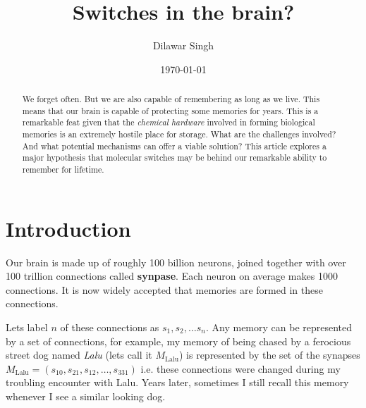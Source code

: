 \documentclass[]{resonance}
\title{Switches in the brain?}
\author{Dilawar Singh}
\date{\today}
\begin{document}
\maketitle

\begin{abstract}
    We forget often. But we are also capable of remembering as long
    as we live. This means that our brain is capable of protecting some memories for
    years. This is a remarkable feat given that the \emph{chemical hardware}
    involved in forming biological memories is an extremely hostile place for
    storage.  What are the challenges involved? And what potential mechanisms
    can offer a viable solution? This article explores a major hypothesis that
    molecular switches may be behind our remarkable ability to remember for lifetime.
\end{abstract}

\maketitle


\section{Introduction}\label{sec:intro}

Our brain is made up of roughly 100 billion neurons, joined together with over
100 trillion connections called \textbf{synpase}. Each neuron on average makes
1000 connections.   It is now widely accepted that memories are
formed in these connections.

Lets label $n$ of these connections as $s_1, s_2, \ldots s_n$. Any memory can be
represented by a set of connections, for example, my memory of being chased by a
ferocious street dog named \emph{Lalu} (lets call it $M_\text{Lalu}$) is
represented by the set of the synapses $M_\text{Lalu}=(s_{10}, s_{21},
s_{12},\ldots,s_{331})$ i.e. these connections were changed during my troubling encounter with
Lalu. Years later, sometimes I still recall this memory whenever I see a similar
looking dog. 
\end{document}
